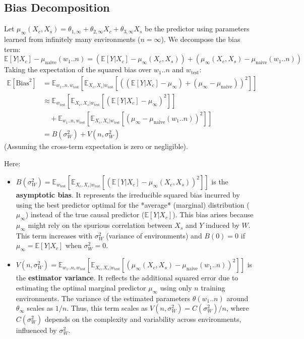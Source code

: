 \documentclass{article}
\begin{document}
\subsection{Bias Decomposition}
Let $\mu_\infty(X_c, X_s) = \theta_{1,\infty} + \theta_{2,\infty}X_c + \theta_{3,\infty}X_s$ be the predictor using parameters learned from infinitely many environments ($n=\infty$). We decompose the bias term:
\[ \mathbb{E}[Y|X_c] - \mu_{\text{naive}}(w_1..n) = (\mathbb{E}[Y|X_c] - \mu_\infty(X_c, X_s)) + (\mu_\infty(X_c, X_s) - \mu_{\text{naive}}(w_1..n)) \]
Taking the expectation of the squared bias over $w_1..n$ and $w_{\text{test}}$:
\begin{align*}
\mathbb{E}[\text{Bias}^2] &= \mathbb{E}_{w_1..n, w_{\text{test}}} \left[ \mathbb{E}_{X_c,X_s | w_{\text{test}}} \left[ ( (\mathbb{E}[Y|X_c] - \mu_\infty) + (\mu_\infty - \mu_{\text{naive}}) )^2 \right] \right] \\
&\approx \mathbb{E}_{w_{\text{test}}} \left[ \mathbb{E}_{X_c,X_s | w_{\text{test}}} \left[ (\mathbb{E}[Y|X_c] - \mu_\infty)^2 \right] \right] \\
&\quad + \mathbb{E}_{w_1..n, w_{\text{test}}} \left[ \mathbb{E}_{X_c,X_s | w_{\text{test}}} \left[ (\mu_\infty - \mu_{\text{naive}}(w_1..n))^2 \right] \right] \\
&= B(\sigma_W^2) + V(n, \sigma_W^2)
\end{align*}
(Assuming the cross-term expectation is zero or negligible).

Here:
\begin{itemize}
    \item $B(\sigma_W^2) = \mathbb{E}_{w_{\text{test}}} [ \mathbb{E}_{X_c,X_s | w_{\text{test}}} [ (\mathbb{E}[Y|X_c] - \mu_\infty(X_c, X_s))^2 ] ]$ is the \textbf{asymptotic bias}. It represents the irreducible squared bias incurred by using the best predictor optimal for the *average* (marginal) distribution ($\mu_\infty$) instead of the true causal predictor ($\mathbb{E}[Y|X_c]$). This bias arises because $\mu_\infty$ might rely on the spurious correlation between $X_s$ and $Y$ induced by $W$. This term increases with $\sigma_W^2$ (variance of environments) and $B(0)=0$ if $\mu_\infty = \mathbb{E}[Y|X_c]$ when $\sigma_W^2=0$.
    \item $V(n, \sigma_W^2) = \mathbb{E}_{w_1..n, w_{\text{test}}} [ \mathbb{E}_{X_c,X_s | w_{\text{test}}} [ (\mu_\infty(X_c, X_s) - \mu_{\text{naive}}(w_1..n))^2 ] ]$ is the \textbf{estimator variance}. It reflects the additional squared error due to estimating the optimal marginal predictor $\mu_\infty$ using only $n$ training environments. The variance of the estimated parameters $\theta(w_1..n)$ around $\theta_\infty$ scales as $1/n$. Thus, this term scales as $V(n, \sigma_W^2) = C(\sigma_W^2) / n$, where $C(\sigma_W^2)$ depends on the complexity and variability across environments, influenced by $\sigma_W^2$.
\end{itemize}
\end{document}
